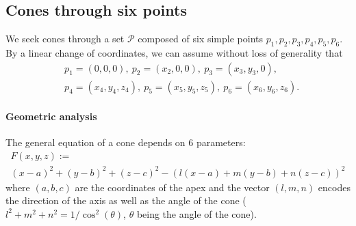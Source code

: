 \documentclass[5p]{elsarticle}
\newcommand\Pc{\mathcal P}
\newcommand{\com}[1]{{\color{black} #1}}
\begin{document}
\subsection{Cones through six points}\label{sec:C6P}
\com{We seek} cones through a set $\Pc$ composed of six simple points $p_1,p_2,p_3,p_4,p_5,p_6$. By a linear change of coordinates, we can assume without loss of generality that
\begin{align}\label{eq:hyp-p1p2p3p4p5p6}
& p_1=(0,0,0), \ p_2=(x_2,0,0), \ p_3=(x_3,y_3,0), \\ \nonumber
& p_4=(x_4,y_4,z_4), \ p_5=(x_5,y_5,z_5), \ p_6=(x_6,y_6,z_6).
\end{align} 

\paragraph{Geometric analysis}
The general equation of a cone depends on 6 parameters:
\begin{multline}\label{eq:eqcone}
F(x,y,z):= \\ (x-a)^2+(y-b)^2+(z-c)^2-(l(x-a)+m(y-b)+n(z-c))^2	
\end{multline}
where $(a,b,c)$ are the coordinates of the apex and the vector $(l,m,n)$ encodes the direction of the axis as well as the angle of the cone ($l^2+m^2+n^2=1/\cos^2(\theta)$, $\theta$ being the angle of the cone).
\end{document}
